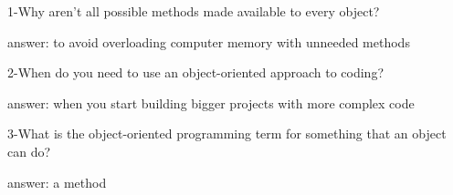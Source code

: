1-Why aren't all possible methods made available to every object?


answer: to avoid overloading computer memory with unneeded methods

2-When do you need to use an object-oriented approach to coding?


answer: when you start building bigger projects with more complex code

3-What is the object-oriented programming term for something that an object can do?


answer: a method

